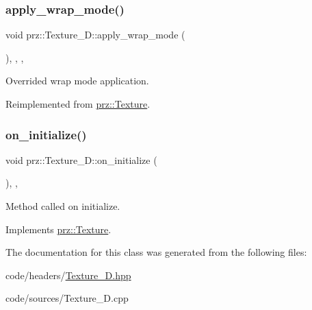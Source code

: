 \subsubsection{\texorpdfstring{apply\_wrap\_mode()}{apply\_wrap\_mode()}}
{\footnotesize\ttfamily void prz\+::\+Texture\+\_\+D\+::apply\+\_\+wrap\+\_\+mode (\begin{DoxyParamCaption}{ }\end{DoxyParamCaption})\hspace{0.3cm}{\ttfamily [inline]}, {\ttfamily [override]}, {\ttfamily [protected]}, {\ttfamily [virtual]}}



Overrided wrap mode application. 



Reimplemented from \mbox{\hyperlink{classprz_1_1_texture_ad68b4a5a4032f74d3ea719f26f78b202}{prz\+::\+Texture}}.

\mbox{\label{classprz_1_1_texture__2_d_abf56074e463a4811b4e64ccf61931d94}} 
\subsubsection{\texorpdfstring{on\_initialize()}{on\_initialize()}}
{\footnotesize\ttfamily void prz\+::\+Texture\+\_\+D\+::on\+\_\+initialize (\begin{DoxyParamCaption}{ }\end{DoxyParamCaption})\hspace{0.3cm}{\ttfamily [override]}, {\ttfamily [protected]}, {\ttfamily [virtual]}}



Method called on initialize. 



Implements \mbox{\hyperlink{classprz_1_1_texture_a75b9d1ba9920727d99e4c167c900fa32}{prz\+::\+Texture}}.



The documentation for this class was generated from the following files\+:\begin{DoxyCompactItemize}
\item 
code/headers/\mbox{\hyperlink{_texture__2_d_8hpp}{Texture\+\_\+D.\+hpp}}\item 
code/sources/Texture\+\_\+D.\+cpp\end{DoxyCompactItemize}
